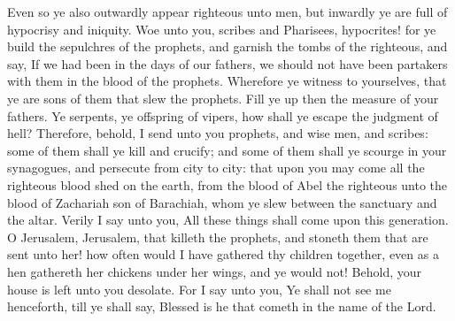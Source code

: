 Even so ye also outwardly appear righteous unto men, but inwardly ye are full of hypocrisy and iniquity.  Woe unto you, scribes and Pharisees, hypocrites! for ye build the sepulchres of the prophets, and garnish the tombs of the righteous, and say, If we had been in the days of our fathers, we should not have been partakers with them in the blood of the prophets. Wherefore ye witness to yourselves, that ye are sons of them that slew the prophets. Fill ye up then the measure of your fathers. Ye serpents, ye offspring of vipers, how shall ye escape the judgment of hell? Therefore, behold, I send unto you prophets, and wise men, and scribes: some of them shall ye kill and crucify; and some of them shall ye scourge in your synagogues, and persecute from city to city: that upon you may come all the righteous blood shed on the earth, from the blood of Abel the righteous unto the blood of Zachariah son of Barachiah, whom ye slew between the sanctuary and the altar. Verily I say unto you, All these things shall come upon this generation.  O Jerusalem, Jerusalem, that killeth the prophets, and stoneth them that are sent unto her! how often would I have gathered thy children together, even as a hen gathereth her chickens under her wings, and ye would not! Behold, your house is left unto you desolate. For I say unto you, Ye shall not see me henceforth, till ye shall say, Blessed is he that cometh in the name of the Lord. 

